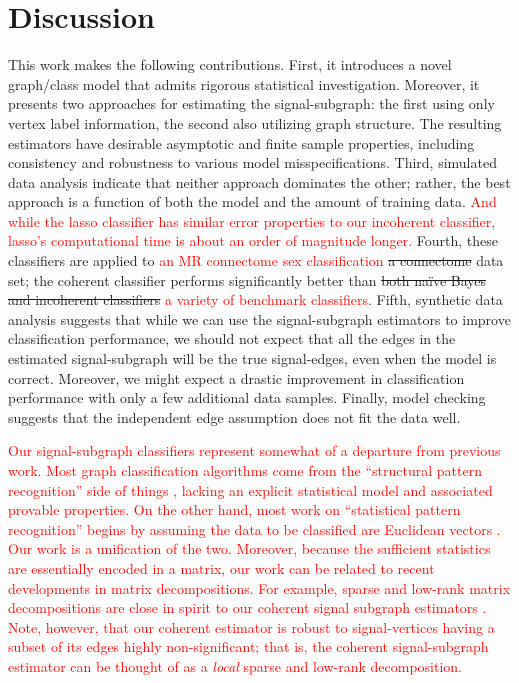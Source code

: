 \documentclass[10pt,journal,cspaper,compsoc]{IEEEtran}
\providecommand{\tr}[1]{\textcolor{red}{#1}}
\begin{document}









\section{Discussion} %
\label{sec:discussion}

This work makes the following contributions. First, it introduces a novel graph/class model that admits rigorous statistical investigation.  Moreover, it presents two approaches for estimating the signal-subgraph: the first using only vertex label information, the second also utilizing graph structure.  The resulting estimators have desirable asymptotic and finite sample properties, including consistency and robustness to various model misspecifications.  Third, simulated data analysis indicate that neither approach dominates the other; rather, the best approach is a function of both the model and the amount of training data. \tr{And while the lasso classifier has similar error properties to our incoherent classifier, lasso's computational time is about an order of magnitude longer.}
Fourth, these classifiers are applied to \tr{an MR connectome sex classification} \sout{a connectome} data set; the coherent classifier performs significantly better than \sout{both na\"ive Bayes and incoherent classifiers} \tr{a variety of benchmark classifiers}.  Fifth, synthetic data analysis suggests that while we can use the signal-subgraph estimators to improve classification performance, we should not expect that all the edges in the estimated signal-subgraph will be the true signal-edges, even when the model is correct. Moreover, we might expect a drastic improvement in classification performance with only a few additional data samples.  Finally, model checking suggests that the independent edge assumption does not fit the data well.  

\tr{Our signal-subgraph classifiers represent somewhat of a departure from previous work.  Most graph classification algorithms come from the ``structural pattern recognition'' side of things \cite{Bunke2011}, lacking an explicit statistical model and associated provable properties. On the other hand, most work on ``statistical pattern recognition'' begins by assuming the data to be classified are Euclidean vectors \cite{Devroye1997}.  Our work is a unification of the two.  Moreover, because the sufficient statistics are essentially encoded in a matrix, our work can be related to recent developments in matrix decompositions.  For example, sparse and low-rank matrix decompositions are close in spirit to our coherent signal subgraph estimators \cite{Candes2009a, Ding11, Chandrasekaran2011}. Note, however, that our coherent estimator is robust to signal-vertices having a subset of its edges highly non-significant; that is, the coherent signal-subgraph estimator can be thought of as a \emph{local} sparse and low-rank decomposition.}
\end{document}
